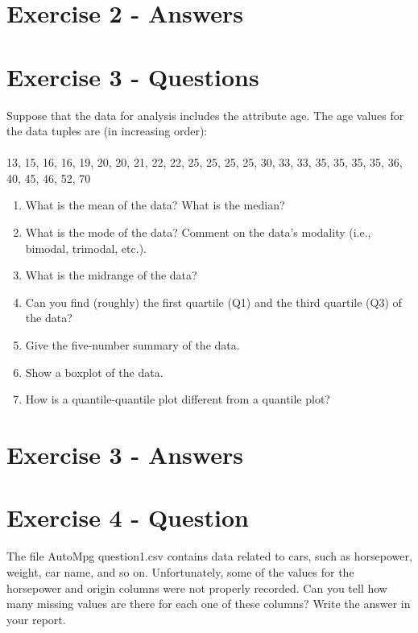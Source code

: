 \documentclass{scrreprt}
\begin{document}
	

\section{Exercise 2 - Answers}















	
\newpage	
\section{Exercise 3 - Questions}
Suppose that the data for analysis includes the attribute age. The age values for the data tuples are (in increasing order):
\\
\\
13, 15, 16, 16, 19, 20, 20, 21, 22, 22, 25, 25, 25, 25, 30, 33, 33, 35, 35, 35, 35, 36, 40, 45, 46, 52, 70
\begin{enumerate}
\item What is the mean of the data? What is the median?
\item What is the mode of the data? Comment on the data’s modality (i.e., bimodal, trimodal, etc.). 
\item What is the midrange of the data?
\item Can you find (roughly) the first quartile (Q1) and the third quartile (Q3) of the data?
\item Give the five-number summary of the data.
\item Show a boxplot of the data.
\item How is a quantile-quantile plot different from a quantile plot?
\end{enumerate}




\section{Exercise 3 - Answers}	












	
\newpage
\section{Exercise 4 - Question}
The file AutoMpg question1.csv contains data related to cars, such as horsepower, weight, car name, and so on. Unfortunately, some of the values for the horsepower and origin columns were not properly recorded. Can you tell how many missing values are there for each one of these columns? Write the answer in your report.
\end{document}
